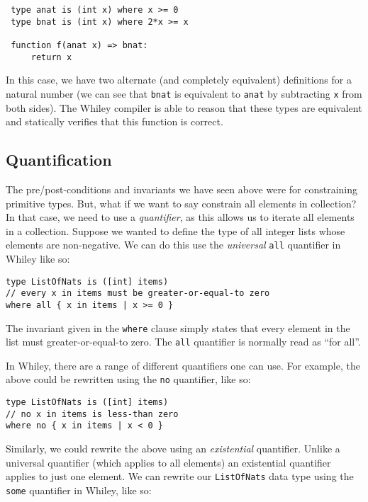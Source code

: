 \begin{lstlisting}
 type anat is (int x) where x >= 0
 type bnat is (int x) where 2*x >= x

 function f(anat x) => bnat:
     return x
\end{lstlisting}
In this case, we have two alternate (and completely equivalent)
definitions for a natural number (we can see that \lstinline{bnat} is
equivalent to \lstinline{anat} by subtracting \lstinline{x} from both sides).
The Whiley compiler is able to reason that these types are equivalent
and statically verifies that this function is correct.

\subsection{Quantification}
The pre/post-conditions and invariants we have seen above were for constraining primitive types.  But, what if we want to say constrain all elements in collection?  In that case, we need to use a {\em quantifier}, as this allows us to iterate all elements in a collection.  Suppose we wanted to define the type of all integer lists whose elements are non-negative.  We can do this use the {\em universal} \lstinline{all} quantifier in Whiley like so:

\begin{lstlisting}
type ListOfNats is ([int] items)
// every x in items must be greater-or-equal-to zero
where all { x in items | x >= 0 }
\end{lstlisting}

The invariant given in the \lstinline{where} clause simply states that every element in the list must greater-or-equal-to zero.  The \lstinline{all} quantifier is normally read as ``for all''.

In Whiley, there are a range of different quantifiers one can use.  For example, the above could be rewritten using the \lstinline{no} quantifier, like so:

\begin{lstlisting}
type ListOfNats is ([int] items)
// no x in items is less-than zero
where no { x in items | x < 0 }
\end{lstlisting}

Similarly, we could rewrite the above using an {\em existential} quantifier.  Unlike a universal quantifier (which applies to all elements) an existential quantifier applies to just one element.  We can rewrite our \lstinline{ListOfNats} data type using the \lstinline{some} quantifier in Whiley, like so:

